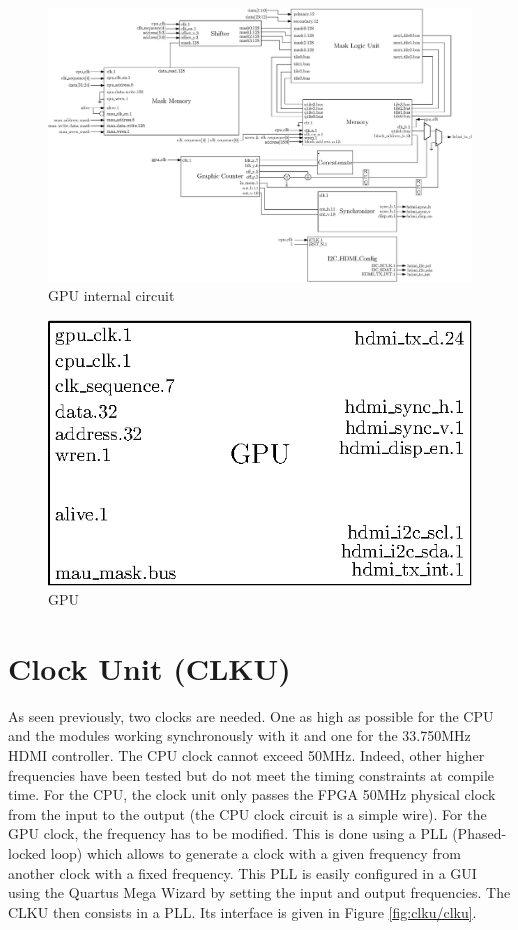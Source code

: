 \begin{figure}[H]
    \centering
    \includegraphics[width=\linewidth]{Chapter4-GPU_CLKU/res/gpu_in}
    \caption{GPU internal circuit}
    \label{fig:gpu/gpu_in}
\end{figure}

\begin{figure}[H]
    \centering
    \includegraphics[scale=1.0]{Chapter4-GPU_CLKU/res/gpu}
    \caption{GPU}
    \label{fig:gpu/gpu}
\end{figure}

\section{Clock Unit (CLKU)}

As seen previously, two clocks are needed. One as high as possible for the CPU and the modules 
working synchronously with it and one for the 33.750MHz HDMI controller. The CPU clock cannot 
exceed 50MHz. Indeed, other higher frequencies have been tested but do not meet the timing 
constraints at compile time. For the CPU, the clock unit only passes the FPGA 50MHz physical clock 
from the input to the output (the CPU clock circuit is a simple wire). For the GPU clock, the frequency
has to be modified. This is done 
using a PLL (Phased-locked loop) which allows to generate a clock with a given frequency from 
another clock with a fixed frequency. This PLL is easily configured in a GUI using the Quartus 
Mega Wizard by setting the input and output frequencies. The CLKU then consists in a PLL. Its interface 
is given in Figure \ref{fig:clku/clku}.

